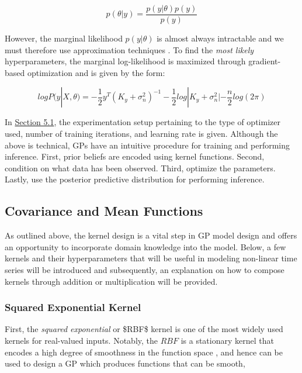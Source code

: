 \begin{equation}
p(\theta | y) = \frac{p(y | \theta)p(y)}{p(y)}
\end{equation}

However, the marginal likelihood $p(y | \theta)$ is almost always intractable and we must therefore use approximation techniques \cite{pml1Book}. To find the \textit{most likely} hyperparameters, the marginal log-likelihood is maximized through gradient-based optimization and is given by the form:

\begin{equation}
log P(y | X, \theta) = -\frac{1}{2}y^T(K_{y} + \sigma_{n}^2)^{-1} - \frac{1}{2}log|K_{y} + \sigma_{n}^2| - \frac{n}{2} log(2\pi)
\end{equation}

In \hyperlink{subsection.5.1}{Section 5.1}, the experimentation setup pertaining to the type of optimizer used, number of training iterations, and learning rate is given. Although the above is technical, GPs have an intuitive procedure for training and performing inference. First, prior beliefs are encoded using kernel functions.  Second, condition on what data has been observed. Third, optimize the parameters. Lastly, use the posterior predictive distribution for performing inference.

\subsection{Covariance and Mean Functions}

As outlined above, the kernel design is a vital step in GP model design and offers an opportunity to incorporate domain knowledge into the model. Below, a few kernels and their hyperparameters that will be useful in modeling non-linear time series will be introduced and subsequently, an explanation on how to compose kernels through addition or multiplication will be provided.

\subsubsection{Squared Exponential Kernel}

First, the \textit{squared exponential} or \ac{$RBF$} kernel is one of the most widely used kernels for real-valued inputs. Notably, the $RBF$ is a stationary kernel that encodes a high degree of smoothness in the function space \cite{pml1Book}, and hence can be used to design a GP which produces functions that can be smooth,

